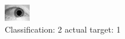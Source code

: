 \begin{figure}[h!]
\begin{center}
\includegraphics[width=0.60\columnwidth]{figures/ID1466_class_2_target_1.png}
\end{center}
\caption{ Classification: 2 actual target: 1}
\label{fig:ID1466_class_2_target_1}
\end{figure}
